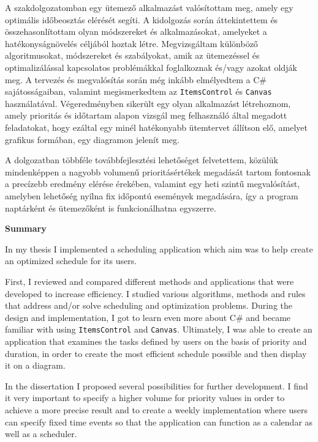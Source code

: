 
A szakdolgozatomban egy ütemező alkalmazást valósítottam meg, amely egy optimális időbeosztás elérését segíti. A kidolgozás során áttekintettem és összehasonlítottam olyan módszereket és alkalmazásokat, amelyeket a hatékonyságnövelés céljából hoztak létre. Megvizsgáltam különböző algoritmusokat, módszereket és szabályokat, amik az ütemezéssel és optimalizálással kapcsolatos problémákkal foglalkoznak és/vagy azokat oldják meg. A tervezés és megvalósítás során még inkább elmélyedtem a C\# sajátosságaiban, valamint megismerkedtem az \texttt{ItemsControl} és \texttt{Canvas} használatával. Végeredményben sikerült egy olyan alkalmazást létrehoznom, amely prioritás és időtartam alapon vizsgál meg felhasználó által megadott feladatokat, hogy ezáltal egy minél hatékonyabb ütemtervet állítson elő, amelyet grafikus formában, egy diagramon jelenít meg.

A dolgozatban többféle továbbfejlesztési lehetőséget felvetettem, közülük mindenképpen a nagyobb volumenű prioritásértékek megadását tartom fontosnak a precízebb eredmény elérése érekében, valamint egy heti szintű megvalósítást, amelyben lehetőség nyílna fix időpontú események megadására, így a program naptárként és ütemezőként is funkcionálhatna egyszerre.

\newpage
\begin{LARGE}
\textbf{Summary}
\end{LARGE}
\vskip 1cm

In my thesis I implemented a scheduling application which aim was to help create an optimized schedule for its users.

First, I reviewed and compared different methods and applications that were developed to increase efficiency. I studied various algorithms, methods and rules that address and/or solve scheduling and optimization problems. During the design and implementation, I got to learn even more about C\# and became familiar with using \texttt{ItemsControl} and \texttt{Canvas}. Ultimately, I was able to create an application that examines the tasks defined by users on the basis of priority and duration, in order to create the most efficient schedule possible and then display it on a diagram.

In the dissertation I proposed several possibilities for further development. I find it very important to specify a higher volume for priority values in order to achieve a more precise result and to create a weekly implementation where users can specify fixed time events so that the application can function as a calendar as well as a scheduler.

